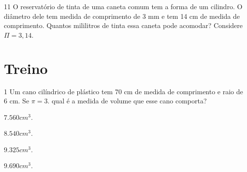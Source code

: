 \num{11} O reservatório de tinta de uma caneta comum tem a forma de um
cilindro. O diâmetro dele tem medida de comprimento de 3 mm e tem 14 cm
de medida de comprimento. Quantos mililitros de tinta essa caneta pode
acomodar? Considere $\Pi = 3,14$.





\vspace{2cm}

\section*{Treino}

\num{1} Um cano cilíndrico de plástico tem 70 cm de medida de comprimento e
raio de 6 cm. Se $\pi = 3$. qual é a medida de volume que esse cano comporta?

\begin{escolha}[itemsep=0pt]
\item $7.560 cm^3$.
\item $8.540 cm^3$.
\item $9.325 cm^3$.
\item $9.690 cm^3$.
\end{escolha}











